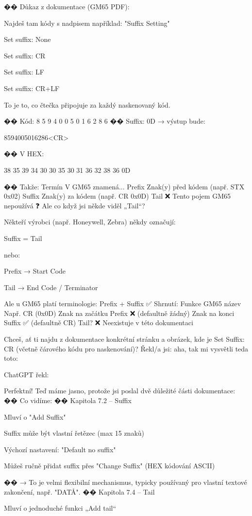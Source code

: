 �� Důkaz z dokumentace (GM65 PDF):

Najdeš tam kódy s nadpisem například:
"Suffix Setting"

    Set suffix: None

    Set suffix: CR

    Set suffix: LF

    Set suffix: CR+LF

To je to, co čtečka připojuje za každý naskenovaný kód.

�� Kód: 8 5 9 4 0 0 5 0 1 6 2 8 6
�� Suffix: 0D → výstup bude:

8594005016286<CR>

�� V HEX:

38 35 39 34 30 30 35 30 31 36 32 38 36 0D

�� Takže:
Termín	V GM65 znamená...
Prefix	Znak(y) před kódem (např. STX 0x02)
Suffix	Znak(y) za kódem (např. CR 0x0D)
Tail	❌ Tento pojem GM65 nepoužívá
❓ Ale co když jsi někde viděl „Tail“?

Někteří výrobci (např. Honeywell, Zebra) někdy označují:

    Suffix = Tail

    nebo:

        Prefix → Start Code

        Tail → End Code / Terminator

Ale u GM65 platí terminologie: Prefix + Suffix
✅ Shrnutí:
Funkce	GM65 název	Např. CR (0x0D)
Znak na začátku	Prefix	❌ (defaultně žádný)
Znak na konci	Suffix	✅ (defaultně CR)
Tail?	❌ Neexistuje v této dokumentaci	

Chceš, ať ti najdu z dokumentace konkrétní stránku a obrázek, kde je Set Suffix: CR (včetně čárového kódu pro naskenování)?
Řekl/a jsi:
aha, tak mi vysvětli teda toto:

ChatGPT řekl:

Perfektní! Teď máme jasno, protože jsi poslal dvě důležité části dokumentace:
�� Co vidíme:
�� Kapitola 7.2 – Suffix

    Mluví o "Add Suffix"

    Suffix může být vlastní řetězec (max 15 znaků)

    Výchozí nastavení: "Default no suffix"

    Můžeš ručně přidat suffix přes "Change Suffix" (HEX kódování ASCII)

�� → To je velmi flexibilní mechanismus, typicky používaný pro vlastní textové zakončení, např. "DATA\r\n".
�� Kapitola 7.4 – Tail

    Mluví o jednoduché funkci „Add tail“

